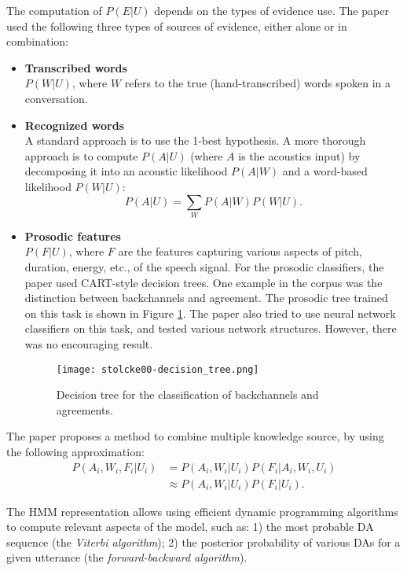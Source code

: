 The computation of $P(E|U)$ depends on the types of evidence use. The paper used the following three types of sources of evidence, either alone or in combination:
\begin{itemize}
\item{\textbf{Transcribed words}\\
$P(W|U)$, where $W$ refers to the true (hand-transcribed) words spoken in a conversation.
}
\item{\textbf{Recognized words}\\
A standard approach is to use the 1-best hypothesis. A more thorough approach is to compute $P(A|U)$ (where $A$ is the acoustics input) by decomposing it into an acoustic likelihood $P(A|W)$ and a word-based likelihood $P(W|U)$:
$$P(A|U) = \sum_W P(A|W) P(W|U).$$
}
\item{\textbf{Prosodic features}\\
$P(F|U)$, where $F$ are the features capturing various aspects of pitch, duration, energy, etc., of the speech signal. For the prosodic classifiers, the paper used CART-style decision trees. One example in the corpus was the distinction between backchannels and agreement. The prosodic tree trained on this task is shown in Figure \ref{fig:stolcke00-decision_tree}. The paper also tried to use neural network classifiers on this task, and tested
various network structures. However, there was no encouraging result.
\begin{figure}[h]
  \centering
  \texttt{[image: stolcke00-decision\_tree.png]}\\
  \caption{Decision tree for the classification of backchannels and agreements.}\label{fig:stolcke00-decision_tree}
\end{figure}
}
\end{itemize}

The paper proposes a method to combine multiple knowledge source, by using the following approximation:
\begin{align*}
P(A_i, W_i, F_i | U_i) &= P(A_i, W_i | U_i) P(F_i | A_i, W_i, U_i)\\
                       &\approx P(A_i, W_i | U_i) P(F_i | U_i).
\end{align*}

The HMM representation allows using efficient dynamic programming algorithms to compute relevant aspects of the model, such as: 1) the most probable DA sequence (the \emph{Viterbi algorithm}); 2) the posterior probability of various DAs for a given utterance (the \emph{forward-backward algorithm}).

